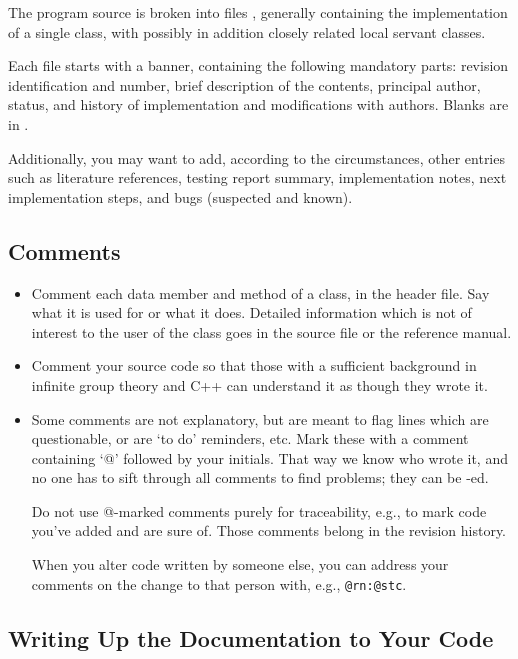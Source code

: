 The program source is broken into files , generally
containing the implementation of a single class, with possibly in
addition closely related local servant classes.

Each file starts with a banner, containing the following mandatory
parts: revision identification and number, brief description of the
contents, principal author, status, and history of implementation and
modifications with authors. Blanks are in 
.

Additionally, you may want to add, according to the circumstances,
other entries such as literature references, testing report summary,
implementation notes, next implementation steps, and bugs (suspected
and known).

\subsection{Comments}

\begin{itemize}
\item
Comment each data member and method of a class, in the header file.
Say what it is used for or what it does. Detailed information which is
not of interest to the user of the class goes in the source file or
the reference manual.
\item
Comment your source code so that those with a sufficient background in
infinite group theory and C++ can understand it as though they wrote
it.
\item
Some comments are not explanatory, but are meant to flag lines which are
questionable, or are `to do' reminders, etc. Mark these with a comment
containing `@' followed by your initials. That way we know who wrote
it, and no one has to sift through all comments to find problems; they
can be -ed.

Do not use @-marked comments purely for traceability, e.g., to mark
code you've added and are sure of. Those comments belong in the
revision history.

When you alter code written by someone else, you can address your
comments on the change to that person with, e.g., {\tt @rn:@stc}.

\end{itemize}

\subsection{Writing Up the Documentation to Your Code}

